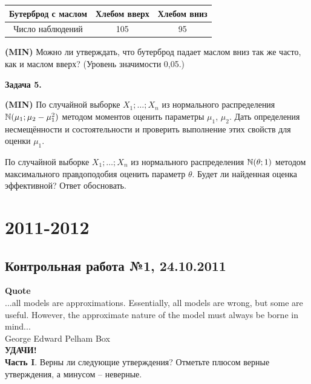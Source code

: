 \documentclass[12pt, a4paper]{article}\usepackage[]{graphicx}\usepackage[]{color}
\newenvironment{enumerate*}{
\begin{enumerate}
  \setlength{\itemsep}{0pt}
  \setlength{\parskip}{0pt}
  \setlength{\parsep}{0pt}
}{\end{enumerate}}
\newcommand{\MIN}{\textbf{(MIN)}{}}
\newenvironment{centered}{%
  \begin{list}{}{%
    \topsep0pt
  }
  \centering
  \item[]
}
{\end{list}}
\begin{document}
\begin{centered}
\begin{tabular}{|c|c|c|}
\hline
Бутерброд с маслом & Хлебом вверх & Хлебом вниз \\ \hline
Число наблюдений & 105 & 95 \\ \hline
\end{tabular}\end{centered}\par\smallskip
\MIN{} Можно ли утверждать, что бутерброд падает маслом вниз так же часто, как и маслом вверх? (Уровень значимости 0{,}05.)
\par\medskip
\textbf{Задача 5.}
\begin{enumerate*}
\item \MIN{} По случайной выборке $X_1;\ldots;X_n$ из нормального распределения $\mathbb N(\mu_1;\mu_2-\mu_1^2)$ методом моментов оценить параметры $\mu_1$, $\mu_2$. Дать определения несмещённости и состоятельности и проверить выполнение этих свойств для оценки $\mu_1$.
\item По случайной выборке $X_1;\ldots;X_n$ из нормального распределения $\mathbb N(\theta;1)$ методом максимального правдоподобия оценить параметр $\theta$. Будет ли найденная оценка эффективной? Ответ обосновать.
\end{enumerate*}





\section{2011-2012}

\subsection{Контрольная работа №1, 24.10.2011}

\textbf{Quote}\\
...all models are approximations. Essentially, all models are wrong, but some are useful. However, the approximate nature of the model must always be borne in mind...\\
George Edward Pelham Box\\

\textbf{УДАЧИ!} \\

\textbf{Часть I}. Верны ли следующие утверждения? Отметьте плюсом верные утверждения, а минусом -- неверные. \\

\renewcommand\arraystretch{2.0}
\end{document}
